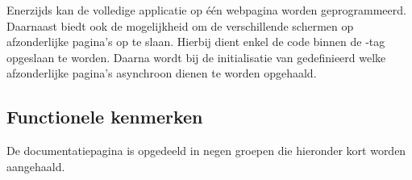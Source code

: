 Enerzijds kan de volledige applicatie op één webpagina worden geprogrammeerd.
Daarnaast biedt \lungo{} ook de mogelijkheid om de verschillende schermen op afzonderlijke pagina's op te slaan.
Hierbij dient enkel de code binnen de -tag opgeslaan te worden.
Daarna wordt bij de initialisatie van \lungo{} gedefinieerd welke afzonderlijke pagina's asynchroon dienen te worden opgehaald.

\subsection{Functionele kenmerken}
De documentatiepagina is opgedeeld in negen groepen die hieronder kort worden aangehaald.

